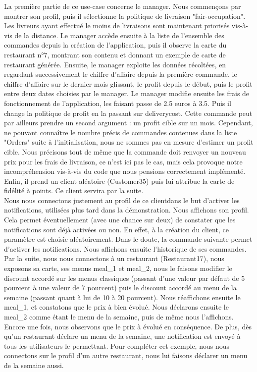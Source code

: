 La première partie de ce use-case concerne le manager. Nous commençons par montrer son profil, puis il sélectionne la politique de livraison "fair-occupation". Les livreurs ayant effectué le moins de livraisons sont maintenant priorisés vis-à-vis de la distance. Le manager accède ensuite à la liste de l'ensemble des commandes depuis la création de l'application, puis il observe la carte du restaurant n°7, montrant son contenu et donnant un exemple de carte de restaurant générée. Ensuite, le manager exploite les données récoltées, en regardant successivement le chiffre d'affaire depuis la première commande, le chiffre d'affaire sur le dernier mois glissant, le profit depuis le début, puis le profit entre deux dates choisies par le manager. Le manager modifie ensuite les frais de fonctionnement de l'application, les faisant passe de 2.5 euros à 3.5. Puis il change la politique de profit en la passant sur deliverycost. Cette commande peut par ailleurs prendre un second argument : un profit cible sur un mois. Cependant, ne pouvant connaître le nombre précis de commandes contenues dans la liste "Orders" suite à l'initialisation, nous ne sommes pas en mesure d'estimer un profit cible. Nous précisons tout de même que la commande doit renvoyer un nouveau prix pour les frais de livraison, ce n'est ici pas le cas, mais cela provoque notre incompréhension vis-à-vis du code que nous pensions correctement implémenté. Enfin, il prend un client aléatoire (Customer35) puis lui attribue la carte de fidélité à points. Ce client servira par la suite. \\

Nous nous connectons justement au profil de ce clientdans le but d'activer les notifications, utilisées plus tard dans la démonstration. Nous affichons son profil. Cela permet éventuellement (avec une chance sur deux) de constater que les notifications sont déjà activées ou non. En effet, à la création du client, ce paramètre est choisie aléatoirement. Dans le doute, la commande suivante permet d'activer les notifications. Nous affichons ensuite l'historique de ses commandes. \\

Par la suite, nous nous connectons à un restaurant (Restaurant17), nous exposons sa carte, ses menus meal\_1 et meal\_2, nous le faisons modifier le discount accordé sur les menus classiques (passant d'une valeur par défaut de 5 pourcent à une valeur de 7 pourcent) puis le discount accordé au menu de la semaine (passant quant à lui de 10 à 20 pourcent). Nous réaffichons ensuite le meal\_1, et constatons que le prix à bien évolué. Nous déclarons ensuite le meal\_2 comme étant le menu de la semaine, puis de même nous l'affichons. Encore une fois, nous observons que le prix à évolué en conséquence. De plus, dès qu'un restaurant déclare un menu de la semaine, une notification est envoyé à tous les utilisateurs le permettant. Pour compléter cet exemple, nous nous connectons sur le profil d'un autre restaurant, nous lui faisons déclarer un menu de la semaine aussi.  \\

